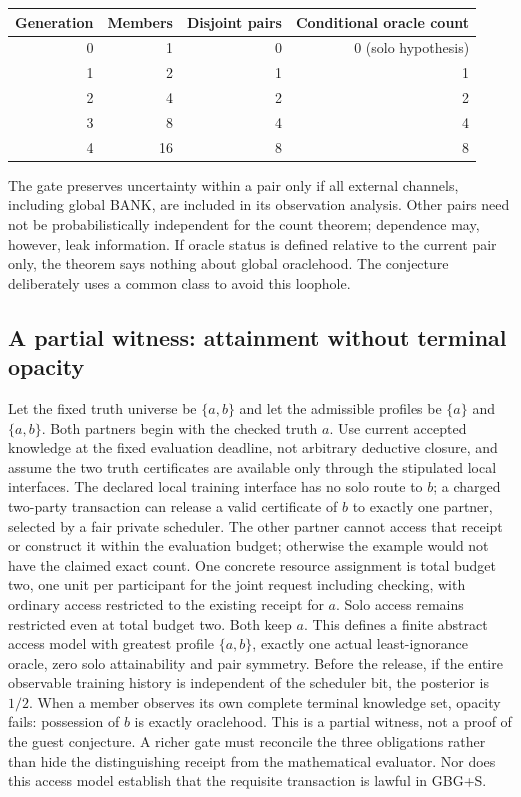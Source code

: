 \documentclass[11pt]{article}
\theoremstyle{definition}\newtheorem{definition}[theorem]{Definition}\newtheorem{conjecture}[theorem]{Conjecture}\newtheorem{example}[theorem]{Example}
\begin{document}
\begin{center}\small
\begin{tabular}{@{}rrrr@{}}\toprule
Generation & Members & Disjoint pairs & Conditional oracle count\\\midrule
0&1&0&0 (solo hypothesis)\\
1&2&1&1\\
2&4&2&2\\
3&8&4&4\\
4&16&8&8\\\bottomrule\end{tabular}
\end{center}
The gate preserves uncertainty within a pair only if all external channels, including global BANK, are included in its observation analysis. Other pairs need not be probabilistically independent for the count theorem; dependence may, however, leak information. If oracle status is defined relative to the current pair only, the theorem says nothing about global oraclehood. The conjecture deliberately uses a common class to avoid this loophole.

\subsection{A partial witness: attainment without terminal opacity}
Let the fixed truth universe be $\{a,b\}$ and let the admissible profiles be $\{a\}$ and $\{a,b\}$. Both partners begin with the checked truth $a$. Use current accepted knowledge at the fixed evaluation deadline, not arbitrary deductive closure, and assume the two truth certificates are available only through the stipulated local interfaces. The declared local training interface has no solo route to $b$; a charged two-party transaction can release a valid certificate of $b$ to exactly one partner, selected by a fair private scheduler. The other partner cannot access that receipt or construct it within the evaluation budget; otherwise the example would not have the claimed exact count. One concrete resource assignment is total budget two, one unit per participant for the joint request including checking, with ordinary access restricted to the existing receipt for $a$. Solo access remains restricted even at total budget two. Both keep $a$. This defines a finite abstract access model with greatest profile $\{a,b\}$, exactly one actual least-ignorance oracle, zero solo attainability and pair symmetry. Before the release, if the entire observable training history is independent of the scheduler bit, the posterior is $1/2$. When a member observes its own complete terminal knowledge set, opacity fails: possession of $b$ is exactly oraclehood. This is a partial witness, not a proof of the guest conjecture. A richer gate must reconcile the three obligations rather than hide the distinguishing receipt from the mathematical evaluator. Nor does this access model establish that the requisite transaction is lawful in GBG+S.
\end{document}
